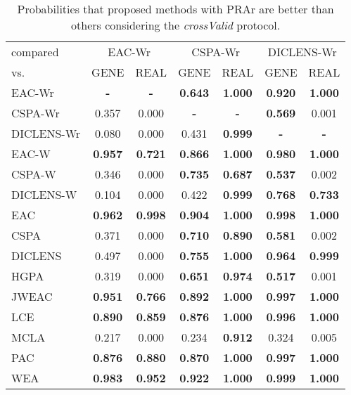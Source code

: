 \begin{table}
	\begin{center}
		\caption{Probabilities that proposed methods with PRAr are better than others considering the \emph{crossValid} protocol.}
		\label{tab:bayescomp:crossValid}
		\begin{tabular*}{1.0\linewidth}{@{\extracolsep{\fill}} l |c c |c c |c c }
			\hline
			compared  & \multicolumn{2}{|c}{EAC-Wr} & \multicolumn{2}{|c}{CSPA-Wr} & \multicolumn{2}{|c}{DICLENS-Wr}\\ 
			vs. & GENE & REAL & GENE & REAL & GENE & REAL \\ \hline
			EAC-Wr& \textbf{-} & \textbf{-}  & \textbf{0.643} & \textbf{1.000} & \textbf{0.920} & \textbf{1.000}\\
			CSPA-Wr & 0.357 & 0.000& \textbf{-} & \textbf{-}  & \textbf{0.569} & 0.001\\
			DICLENS-Wr & 0.080 & 0.000 & 0.431 & \textbf{0.999}& \textbf{-} & \textbf{-} \\
			EAC-W & \textbf{0.957} & \textbf{0.721} & \textbf{0.866} & \textbf{1.000} & \textbf{0.980} & \textbf{1.000}\\
			CSPA-W & 0.346 & 0.000 & \textbf{0.735} & \textbf{0.687} & \textbf{0.537} & 0.002\\
			DICLENS-W & 0.104 & 0.000 & 0.422 & \textbf{0.999} & \textbf{0.768} & \textbf{0.733}\\
			EAC & \textbf{0.962} & \textbf{0.998} & \textbf{0.904} & \textbf{1.000} & \textbf{0.998} & \textbf{1.000}\\
			CSPA & 0.371 & 0.000 & \textbf{0.710} & \textbf{0.890} & \textbf{0.581} & 0.002\\
			DICLENS & 0.497 & 0.000 & \textbf{0.755} & \textbf{1.000} & \textbf{0.964} & \textbf{0.999}\\
			HGPA & 0.319 & 0.000 & \textbf{0.651} & \textbf{0.974} & \textbf{0.517} & 0.001\\
			JWEAC & \textbf{0.951} & \textbf{0.766} & \textbf{0.892} & \textbf{1.000} & \textbf{0.997} & \textbf{1.000}\\
			LCE & \textbf{0.890} & \textbf{0.859} & \textbf{0.876} & \textbf{1.000} & \textbf{0.996} & \textbf{1.000}\\
			MCLA & 0.217 & 0.000 & 0.234 & \textbf{0.912} & 0.324 & 0.005\\
			PAC & \textbf{0.876} & \textbf{0.880} & \textbf{0.870} & \textbf{1.000} & \textbf{0.997} & \textbf{1.000}\\
			WEA & \textbf{0.983} & \textbf{0.952} & \textbf{0.922} & \textbf{1.000} & \textbf{0.999} & \textbf{1.000}\\
			\hline
		\end{tabular*}
	\end{center}
\end{table}
